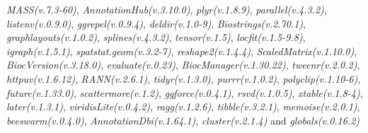 \documentclass[
]{book}
\begin{document}
\emph{MASS(v.7.3-60)}, \emph{AnnotationHub(v.3.10.0)}, \emph{plyr(v.1.8.9)}, \emph{parallel(v.4.3.2)}, \emph{listenv(v.0.9.0)}, \emph{ggrepel(v.0.9.4)}, \emph{deldir(v.1.0-9)}, \emph{Biostrings(v.2.70.1)}, \emph{graphlayouts(v.1.0.2)}, \emph{splines(v.4.3.2)}, \emph{tensor(v.1.5)}, \emph{locfit(v.1.5-9.8)}, \emph{igraph(v.1.5.1)}, \emph{spatstat.geom(v.3.2-7)}, \emph{reshape2(v.1.4.4)}, \emph{ScaledMatrix(v.1.10.0)}, \emph{BiocVersion(v.3.18.0)}, \emph{evaluate(v.0.23)}, \emph{BiocManager(v.1.30.22)}, \emph{tweenr(v.2.0.2)}, \emph{httpuv(v.1.6.12)}, \emph{RANN(v.2.6.1)}, \emph{tidyr(v.1.3.0)}, \emph{purrr(v.1.0.2)}, \emph{polyclip(v.1.10-6)}, \emph{future(v.1.33.0)}, \emph{scattermore(v.1.2)}, \emph{ggforce(v.0.4.1)}, \emph{rsvd(v.1.0.5)}, \emph{xtable(v.1.8-4)}, \emph{later(v.1.3.1)}, \emph{viridisLite(v.0.4.2)}, \emph{ragg(v.1.2.6)}, \emph{tibble(v.3.2.1)}, \emph{memoise(v.2.0.1)}, \emph{beeswarm(v.0.4.0)}, \emph{AnnotationDbi(v.1.64.1)}, \emph{cluster(v.2.1.4)} and \emph{globals(v.0.16.2)}

  
\end{document}
